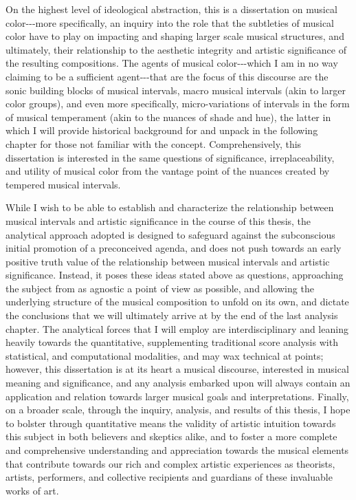 On the highest level of ideological abstraction, this is a dissertation
on musical color-\/-\/-more specifically, an inquiry into the role that
the subtleties of musical color have to play on impacting and shaping
larger scale musical structures, and ultimately, their relationship to
the aesthetic integrity and artistic significance of the resulting
compositions. The agents of musical color-\/-\/-which I am in no way
claiming to be a sufficient agent-\/-\/-that are the focus of this
discourse are the sonic building blocks of musical intervals, macro
musical intervals (akin to larger color groups), and even more
specifically, micro-variations of intervals in the form of musical
temperament (akin to the nuances of shade and hue), the latter in which
I will provide historical background for and unpack in the following
chapter for those not familiar with the concept. Comprehensively, this
dissertation is interested in the same questions of significance,
irreplaceability, and utility of musical color from the vantage point of
the nuances created by tempered musical intervals.

While I wish to be able to establish and characterize the relationship
between musical intervals and artistic significance in the course of
this thesis, the analytical approach adopted is designed to safeguard
against the subconscious initial promotion of a preconceived agenda, and
does not push towards an early positive truth value of the relationship
between musical intervals and artistic significance. Instead, it poses
these ideas stated above as questions, approaching the subject from as
agnostic a point of view as possible, and allowing the underlying
structure of the musical composition to unfold on its own, and dictate
the conclusions that we will ultimately arrive at by the end of the last
analysis chapter. The analytical forces that I will employ are
interdisciplinary and leaning heavily towards the quantitative,
supplementing traditional score analysis with statistical, and
computational modalities, and may wax technical at points; however, this
dissertation is at its heart a musical discourse, interested in musical
meaning and significance, and any analysis embarked upon will always
contain an application and relation towards larger musical goals and
interpretations. Finally, on a broader scale, through the inquiry,
analysis, and results of this thesis, I hope to bolster through
quantitative means the validity of artistic intuition towards this
subject in both believers and skeptics alike, and to foster a more
complete and comprehensive understanding and appreciation towards the
musical elements that contribute towards our rich and complex artistic
experiences as theorists, artists, performers, and collective recipients
and guardians of these invaluable works of art.

